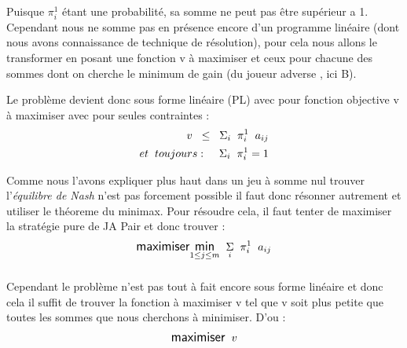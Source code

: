 \documentclass[a4paper, 12pt, twoside]{article}
\begin{document}
{\paragraph*{}{Puisque $\pi_{i}^{1}$ étant une probabilité, sa somme ne peut pas être supérieur a 1. Cependant nous ne somme pas en présence encore d'un programme linéaire (dont nous avons connaissance de technique de résolution), pour cela nous allons le transformer  en posant une fonction  \textsf{v} à maximiser et ceux pour chacune des sommes dont on cherche le minimum de gain (du joueur adverse , ici B)}. \newline 

Le problème devient donc sous forme linéaire (PL) avec pour fonction objective \textsf{v} à maximiser avec pour seules contraintes : 
\begin{align*}
\large{v \hspace{0.2 cm} \leq  \hspace{0.2 cm}\Sigma_{i}\hspace{0.2 cm} \pi_{i}^{1}\hspace{0.2 cm} a _{ij}} \\ et \hspace{0,2 cm} toujours : \hspace{0,4 cm}
\large{\Sigma_{i} \hspace{0.2 cm} \pi_{i}^{1} = 1}
\end{align*}
{Comme nous l'avons expliquer plus haut dans un jeu à somme nul trouver l'\textit{équilibre de Nash} n'est pas forcement possible il faut donc résonner autrement et utiliser le théoreme du \textsf{minimax}. Pour résoudre cela, il faut tenter de maximiser la stratégie pure de JA \textsf{Pair} et donc trouver : \newline
\begin{align*}
 \large {\textsf{maximiser} \underset{1 \leq j \leq m}{\textsf{min}} \hspace{0,2cm}  \underset{i}{\Sigma} \hspace{0,2cm} \pi_{i}^{1} \hspace{0,2cm}  a _{ij} }  
\end{align*}
\subparagraph*{}{Cependant le problème n'est pas tout à fait encore sous forme linéaire et donc cela il suffit de trouver la fonction à maximiser \textsf{v} tel que \textsf{v} soit plus petite que toutes les sommes que nous cherchons à minimiser. D'ou :} 
\begin{align*}
\large {\textsf{maximiser} \hspace{0,2 cm} v }\\ 

\end{align*}}}
\end{document}
